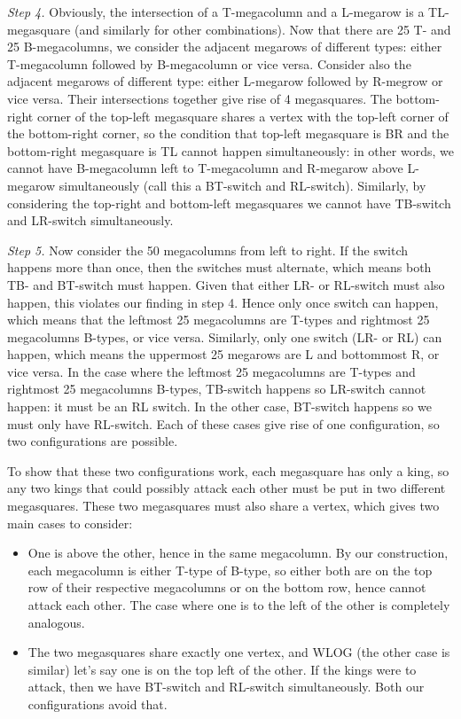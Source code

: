 \documentclass[12pt]{article}
\newcommand{\<}{\langle}
\renewcommand{\>}{\rangle}
\begin{document}
\begin{enumerate}
	\emph{Step 4.} Obviously, the intersection of a T-megacolumn and a L-megarow is a TL-megasquare (and similarly for other combinations). Now that there are 25 T- and 25 B-megacolumns, we consider the adjacent megarows of different types: either T-megacolumn followed by B-megacolumn or vice versa. Consider also the adjacent megarows of different type: either L-megarow followed by R-megrow or vice versa. Their intersections together give rise of 4 megasquares. The bottom-right corner of the top-left megasquare shares a vertex with the top-left corner of the bottom-right corner, so the condition that top-left megasquare is BR and the bottom-right megasquare is TL cannot happen simultaneously: in other words, we cannot have B-megacolumn left to T-megacolumn and R-megarow above L-megarow simultaneously (call this a BT-switch and RL-switch). 
	Similarly, by considering the top-right and bottom-left megasquares we cannot have 	TB-switch and LR-switch simultaneously. 
	
	\emph{Step 5.} Now consider the 50 megacolumns from left to right. If the switch happens more than once, then the switches must alternate, which means both TB- and BT-switch must happen. Given that either LR- or RL-switch must also happen, this violates our finding in step 4. Hence only once switch can happen, which means that the leftmost 25 megacolumns are T-types and rightmost 25 megacolumns B-types, or vice versa. Similarly, only one switch (LR- or RL) can happen, which means the uppermost 25 megarows are L and bottommost R, or vice versa. In the case where the leftmost 25 megacolumns are T-types and rightmost 25 megacolumns B-types, TB-switch happens so LR-switch cannot happen: it must be an RL switch. In the other case, BT-switch happens so we must only have RL-switch. Each of these cases give rise of one configuration, so two configurations are possible. 
	
	To show that these two configurations work, each megasquare has only a king, so any two kings that could possibly attack each other must be put in two different megasquares. These two megasquares must also share a vertex, which gives two main cases to consider:
	\begin{itemize}
		\item One is above the other, hence in the same megacolumn. By our construction, each megacolumn is either T-type of B-type, so either both are on the top row of their respective megacolumns or on the bottom row, hence cannot attack each other. The case where one is to the left of the other is completely analogous. 
		
		\item The two megasquares share exactly one vertex, and WLOG (the other case is similar) let's say one is on the top left of the other. If the kings were to attack, then we have BT-switch and RL-switch simultaneously. Both our configurations avoid that. 
	\end{itemize}
\end{enumerate}
\end{document}
